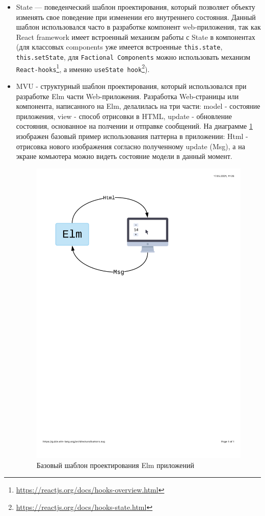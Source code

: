 \documentclass[a4paper,12pt,reqno]{article}
\begin{document}
\begin{itemize}
    \item State — поведенческий шаблон проектирования, который позволяет объекту изменять свое поведение при изменении его внутреннего состояния. Данный шаблон использовался часто в разработке компонент web-приложения, так как React framework имеет встроенный механизм работы с State в компонентах (для классовых components уже имеется встроенные \texttt{this.state}, \texttt{this.setState}, для  \texttt{Factional Components} можно использовать механизм \texttt{React-hooks}\footnote{\url{https://reactjs.org/docs/hooks-overview.html}}, а именно \texttt{useState hook}\footnote{\url{https://reactjs.org/docs/hooks-state.html}}).
    
    \item MVU - структурный шаблон проектирования, который использовался при разработке Elm части Web-приложения. Разработка Web-страницы или компонента, написанного на Elm, делалилась на три части: model - состояние приложения, view - способ отрисовки в HTML, update - обновление состояния, основанное на полчении и отправке сообщений. На диаграмме \ref{pic: elm} изображен базовый пример использования паттерна в приложении: Html - отрисовка нового изображения согласно полученному update (Msg), а на экране комьютера можно видеть состояние модели в данный момент.
     
    \begin{figure}[h!]
		\centering
		\includegraphics[width = 0.6\linewidth]{img/mvu.pdf}
		\caption{Базовый шаблон проектирования Elm приложений}
		\label{pic: elm}
    \end{figure} 
\end{itemize}
\end{document}
